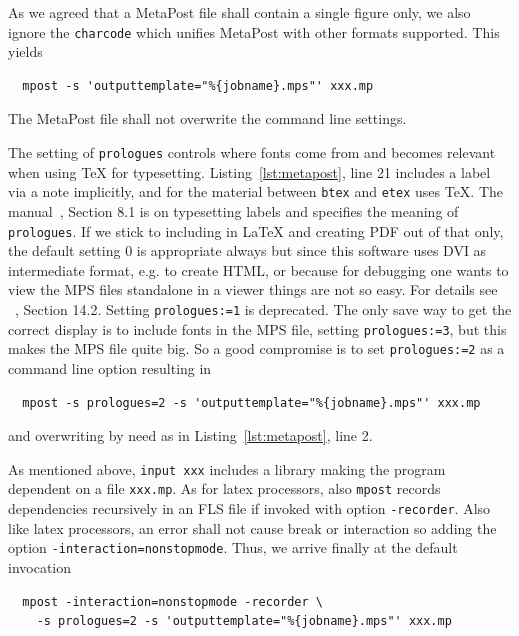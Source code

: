 As we agreed that a MetaPost file shall contain a single figure only, 
we also ignore the \texttt{charcode} which unifies MetaPost with other formats supported. 
This yields 
%
\begin{verbatim}
  mpost -s 'outputtemplate="%{jobname}.mps"' xxx.mp
\end{verbatim}
%
The MetaPost file shall not overwrite the command line settings. 

The setting of \texttt{prologues} controls where fonts come from and 
becomes relevant when using \TeX{} for typesetting. 
Listing~\ref{lst:metapost}, line 21 includes a label via a note implicitly, 
and for the material between \texttt{btex} and \texttt{etex} uses \TeX{}. 
The manual~\cite{MPost}, Section 8.1 is on typesetting labels 
and specifies the meaning of \texttt{prologues}. 
If we stick to including in \LaTeX{} and creating PDF out of that only, 
the default setting $0$ is appropriate always 
but since this software uses DVI as intermediate format, e.g. to create HTML, 
or because for debugging one wants to view the MPS files standalone in a viewer 
things are not so easy. 
For details see ~\cite{MPost}, Section 14.2. 
Setting \texttt{prologues:=1} is deprecated. 
The only save way to get the correct display is to include fonts in the MPS file, 
setting \texttt{prologues:=3}, but this makes the MPS file quite big. 
So a good compromise is to set \texttt{prologues:=2} as a command line option 
resulting in 
%
\begin{verbatim}
  mpost -s prologues=2 -s 'outputtemplate="%{jobname}.mps"' xxx.mp
\end{verbatim}
%
and overwriting by need as in Listing~\ref{lst:metapost}, line 2. 

As mentioned above, \texttt{input xxx} includes a library 
making the program dependent on a file \texttt{xxx.mp}. 
As for latex processors, also \texttt{mpost} records dependencies recursively 
in an FLS file if invoked with option \texttt{-recorder}. 
Also like latex processors, an error shall not cause break or interaction 
so adding the option \texttt{-interaction=nonstopmode}. 
Thus, we arrive finally at the default invocation 
%
\begin{verbatim}
  mpost -interaction=nonstopmode -recorder \
    -s prologues=2 -s 'outputtemplate="%{jobname}.mps"' xxx.mp
\end{verbatim}











